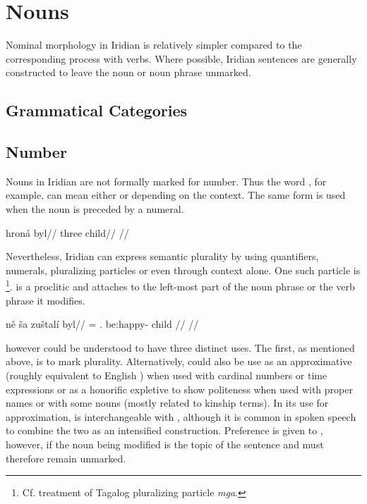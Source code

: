 \chapter{Nouns}

Nominal morphology in Iridian is relatively simpler compared to the corresponding process with verbs. Where possible, Iridian sentences are generally constructed to leave the noun or noun phrase unmarked.

\section{Grammatical Categories}

\section{Number}

Nouns in Iridian are not formally marked for number. Thus the word , for example, can mean either  or  depending on the context. The same form is used when the noun is preceded by a numeral.

\pex
\begingl
\gla hroná byl//
\glb three child//
\glft {}//
\endgl
\xe

Nevertheless, Iridian can express semantic plurality by using quantifiers, numerals, pluralizing particles or even through context alone. One such particle is \label{sec:plurals}\footnote{Cf.  treatment of Tagalog pluralizing particle \emph{mga}.}.  is a proclitic and attaches to the left-most part of the noun phrase or the verb phrase it modifies.

\pex
\begingl
    \gla ně ša zuštalí byl//
    \glb \Pl{}= \Dem{}.\Prox{} be:happy-\Att{} child //
    \glft {}//
\endgl
\xe

 however could be understood to have three distinct uses. The first, as mentioned above, is to mark plurality. Alternatively,  could also be use as an approximative (roughly equivalent to English ) when used with cardinal numbers or time expressions or as a honorific expletive to show politeness when used with proper names or with some nouns (mostly related to kinship terms). In its use for approximation,  is interchangeable with , although it is common in spoken speech to combine the two as an intensified construction. Preference is given to , however, if the noun being modified is the topic of the sentence and must therefore remain unmarked.

